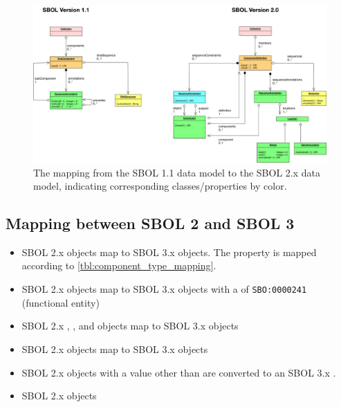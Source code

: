 \begin{figure}[h]
\begin{center}
  \includegraphics[width=\textwidth]{images/sbol_v1_to_v2}
\end{center}
\caption{\label{SBOL1TO2}The mapping from the SBOL 1.1 data model to the SBOL 2.x  data model, indicating corresponding classes/properties by color.}
\end{figure}

\subsection{Mapping between SBOL 2 and SBOL 3}

\begin{itemize}
    \item SBOL 2.x  objects map to SBOL 3.x  objects.  The  property is mapped according to  \autoref{tbl:component_type_mapping}.
    \item SBOL 2.x  objects map to SBOL 3.x  objects with a  of \texttt{SBO:0000241} (functional entity)
    \item SBOL 2.x , , and  objects map to SBOL 3.x  objects
    \item SBOL 2.x  objects map to SBOL 3.x  objects
    \item SBOL 2.x  objects with a value other than  are converted to an SBOL 3.x . 
    \item SBOL 2.x  objects 
\end{itemize}




